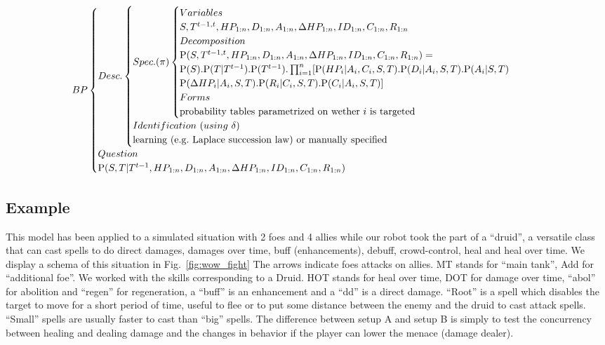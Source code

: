 \begin{eqnarray*}
BP
\begin{cases}
Desc.
    \begin{cases}
    Spec. (\pi)
        \begin{cases}
        Variables\\
        S, T^{t-1,t}, HP_{1:n}, D_{1:n}, A_{1:n}, \Delta HP_{1:n}, ID_{1:n}, C_{1:n}, R_{1:n}\\
        Decomposition\\
        \PP(S, T^{t-1,t}, HP_{1:n}, D_{1:n}, A_{1:n}, \Delta HP_{1:n}, ID_{1:n}, C_{1:n}, R_{1:n}) = \\
        \PP(S).\PP(T|T^{t-1}).\PP(T^{t-1}).\prod_{i=1}^n [ \PP(HP_i | A_i, C_i, S, T).\PP(D_i | A_i, S, T).\PP(A_i | S, T) \\
                \PP(\Delta HP_i | A_i, S, T). \PP(R_i | C_i, S, T). \PP(C_i | A_i, S, T) ]\\
        Forms\\
        \mathrm{probability\ tables\ parametrized\ on\ wether\ }i\ \mathrm{is\ targeted}\\
        \end{cases}\\
    Identification\ (using\ \delta)\\
    \mathrm{learning\ (e.g.\ Laplace\ succession\ law)\ or\ manually\ specified}\\
    \end{cases}\\
Question\\
\PP(S,T|T^{t-1}, HP_{1:n}, D_{1:n}, A_{1:n}, \Delta HP_{1:n}, ID_{1:n}, C_{1:n}, R_{1:n})
\end{cases}
\end{eqnarray*}

\subsection{Example}

This model has been applied to a simulated situation with 2 foes and 4 allies while our robot took the part of a ``druid'', a versatile class that can cast spells to do direct damages, damages over time, buff (enhancements), debuff, crowd-control, heal and heal over time. We display a schema of this situation in Fig.~\ref{fig:wow_fight} The arrows indicate foes attacks on allies. MT stands for ``main tank'', Add for ``additional foe''. We worked with the skills corresponding to a Druid. HOT stands for heal over time, DOT for damage over time, ``abol'' for abolition and ``regen'' for regeneration, a ``buff'' is an enhancement and a ``dd'' is a direct damage. ``Root'' is a spell which disables the target to move for a short period of time, useful to flee or to put some distance between the enemy and the druid to cast attack spells. ``Small'' spells are usually faster to cast than ``big'' spells. The difference between setup A and setup B is simply to test the concurrency between healing and dealing damage and the changes in behavior if the player can lower the menace (damage dealer).

